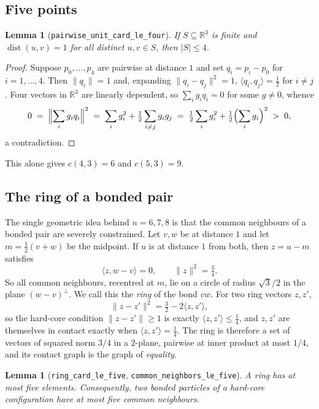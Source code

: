 \documentclass[11pt,a4paper]{article}
\theoremstyle{plain}
\newtheorem{lemma}[theorem]{Lemma}
\theoremstyle{definition}
\newcommand{\R}{\mathbb{R}}
\newcommand{\card}[1]{\lvert #1 \rvert}
\newcommand{\norm}[1]{\lVert #1 \rVert}
\newcommand{\inner}[2]{\langle #1, #2 \rangle}
\begin{document}
\subsection{Five points}

\begin{lemma}[\texttt{pairwise\_unit\_card\_le\_four}]
\label{lem:k5}
If $S \subseteq \R^3$ is finite and $\operatorname{dist}(u,v) = 1$ for all distinct
$u,v \in S$, then $\card S \le 4$.
\end{lemma}

\begin{proof}
Suppose $p_0,\dots,p_4$ are pairwise at distance $1$ and set $q_i = p_i - p_0$ for
$i = 1,\dots,4$. Then $\norm{q_i} = 1$ and, expanding
$\norm{q_i - q_j}^2 = 1$, $\inner{q_i}{q_j} = \tfrac12$ for $i \ne j$. Four vectors in
$\R^3$ are linearly dependent, so $\sum_i g_i q_i = 0$ for some $g \ne 0$, whence
\[
  0 \;=\; \Bigl\lVert \sum_i g_i q_i \Bigr\rVert^2
    \;=\; \sum_i g_i^2 + \tfrac12\sum_{i \ne j} g_i g_j
    \;=\; \tfrac12 \sum_i g_i^2 + \tfrac12 \Bigl(\sum_i g_i\Bigr)^2 \;>\; 0,
\]
a contradiction.
\end{proof}

This alone gives $c(4,3)=6$ and $c(5,3)=9$.

\subsection{The ring of a bonded pair}

The single geometric idea behind $n = 6,7,8$ is that the common neighbours of a bonded
pair are severely constrained. Let $v,w$ be at distance $1$ and let $m = \tfrac12(v+w)$
be the midpoint. If $u$ is at distance $1$ from both, then $z = u - m$ satisfies
\[
  \inner{z}{w-v} = 0,
  \qquad
  \norm{z}^2 = \tfrac34 .
\]
So all common neighbours, recentred at $m$, lie on a circle of radius $\sqrt3/2$ in the
plane $(w-v)^\perp$. We call this the \emph{ring} of the bond $vw$. For two ring
vectors $z,z'$,
\[
  \norm{z - z'}^2 = \tfrac32 - 2\inner{z}{z'},
\]
so the hard-core condition $\norm{z-z'} \ge 1$ is exactly $\inner{z}{z'} \le \tfrac14$,
and $z,z'$ are themselves in contact exactly when $\inner{z}{z'} = \tfrac14$. The ring
is therefore a set of vectors of squared norm $3/4$ in a $2$-plane, pairwise at inner
product at most $1/4$, and its contact graph is the graph of \emph{equality}.

\begin{lemma}[\texttt{ring\_card\_le\_five}, \texttt{common\_neighbors\_le\_five}]
\label{lem:ringfive}
A ring has at most five elements. Consequently, two bonded particles of a hard-core
configuration have at most five common neighbours.
\end{lemma}
\end{document}
